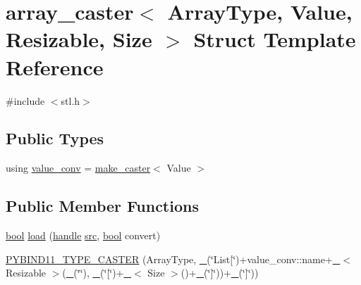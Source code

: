 \hypertarget{structarray__caster}{}\section{array\+\_\+caster$<$ Array\+Type, Value, Resizable, Size $>$ Struct Template Reference}
\label{structarray__caster}


{\ttfamily \#include $<$stl.\+h$>$}

\subsection*{Public Types}
\begin{DoxyCompactItemize}
\item 
using \mbox{\hyperlink{structarray__caster_a9614e5ea042dadbc2f12c067d6bd27f2}{value\+\_\+conv}} = \mbox{\hyperlink{cast_8h_ab32b52411a6b07420516d79074815713}{make\+\_\+caster}}$<$ Value $>$
\end{DoxyCompactItemize}
\subsection*{Public Member Functions}
\begin{DoxyCompactItemize}
\item 
\mbox{\hyperlink{asdl_8h_af6a258d8f3ee5206d682d799316314b1}{bool}} \mbox{\hyperlink{structarray__caster_ad0d8f8e2a90d20917e3496f8aeea6d8b}{load}} (\mbox{\hyperlink{classhandle}{handle}} \mbox{\hyperlink{_s_d_l__opengl__glext_8h_a72e0fdf0f845ded60b1fada9e9195cd7}{src}}, \mbox{\hyperlink{asdl_8h_af6a258d8f3ee5206d682d799316314b1}{bool}} convert)
\item 
\mbox{\hyperlink{structarray__caster_a0c14bf91b3fea20a11f5c086a1a04fa0}{P\+Y\+B\+I\+N\+D11\+\_\+\+T\+Y\+P\+E\+\_\+\+C\+A\+S\+T\+ER}} (Array\+Type, \mbox{\hyperlink{descr_8h_af114703e20c6527e87163eb2798f74b8}{\+\_\+}}(\char`\"{}List\mbox{[}\char`\"{})+value\+\_\+conv\+::name+\mbox{\hyperlink{descr_8h_af114703e20c6527e87163eb2798f74b8}{\+\_\+}}$<$ Resizable $>$(\mbox{\hyperlink{descr_8h_af114703e20c6527e87163eb2798f74b8}{\+\_\+}}(\char`\"{}\char`\"{}), \mbox{\hyperlink{descr_8h_af114703e20c6527e87163eb2798f74b8}{\+\_\+}}(\char`\"{}\mbox{[}\char`\"{})+\mbox{\hyperlink{descr_8h_af114703e20c6527e87163eb2798f74b8}{\+\_\+}}$<$ Size $>$()+\mbox{\hyperlink{descr_8h_af114703e20c6527e87163eb2798f74b8}{\+\_\+}}(\char`\"{}\mbox{]}\char`\"{}))+\mbox{\hyperlink{descr_8h_af114703e20c6527e87163eb2798f74b8}{\+\_\+}}(\char`\"{}\mbox{]}\char`\"{}))
\end{DoxyCompactItemize}
